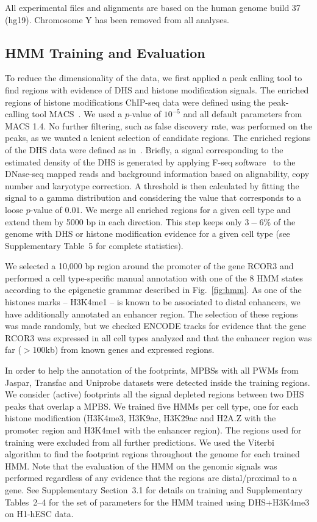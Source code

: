 \documentclass{bioinfo}
\begin{document}
\begin{methods}
All experimental files and alignments are based on the human genome build 37 (hg19).
Chromosome Y has been removed from all analyses.

\subsection{HMM Training and Evaluation}
\label{sec:application.hmm}

To reduce the dimensionality of the data, we first applied a peak calling tool
to find regions with evidence of DHS and histone modification signals. The enriched
regions of histone modifications ChIP-seq data were defined using the peak-calling
tool MACS~\citep{zhang2008}. We used a $p$-value of $ 10^{-5} $ and all default
parameters from MACS 1.4. No further filtering, such as false discovery rate, was
performed on the peaks, as we wanted a lenient selection of candidate regions. The
enriched regions of the DHS data were defined as in~\cite{boyle2011}. Briefly, a
signal corresponding to the estimated density of the DHS is generated by applying F-seq
software~\citep{boyle2008b} to the DNase-seq mapped reads and background information
based on alignability, copy number and karyotype correction. A threshold is then
calculated by fitting the signal to a gamma distribution and considering the value
that corresponds to a loose $p$-value of $ 0.01 $. We merge all enriched regions
for a given cell type and extend them by 5000 bp in each direction. This step keeps
only $3-6\%$ of the genome with DHS or histone modification evidence for a given
cell type (see Supplementary Table~5 for complete statistics).

We selected a 10,000 bp region around the promoter of the gene RCOR3 and performed
a cell type-specific manual annotation with one of the 8 HMM states according to the
epigenetic grammar described in Fig.~\ref{fig:hmm}. As one of the histones marks
-- H3K4me1 -- is known to be associated to distal enhancers, we have additionally
annotated an enhancer region. The selection of these regions was made randomly, but
we checked ENCODE tracks for evidence that the gene RCOR3 was expressed in all cell types
analyzed and that the enhancer region was far ($>$100kb) from known genes and expressed
regions.

In order to help the annotation of the footprints, MPBSs with all PWMs from Jaspar,
Transfac and Uniprobe datasets were detected inside the training regions. We consider
(active) footprints all the signal depleted regions between two DHS peaks that overlap
a MPBS. We trained five HMMs per cell type, one for each histone modification (H3K4me3, H3K9ac,
H3K29ac and H2A.Z with the promoter region and H3K4me1 with the enhancer region). The regions
used for training were excluded from all further predictions. We used the Viterbi algorithm
to find the footprint regions throughout the genome for each trained HMM. Note that the
evaluation of the HMM on the genomic signals was performed regardless of any evidence that
the regions are distal/proximal to a gene. See Supplementary Section~3.1 for details
on training and Supplementary Tables~2--4 for the set of parameters for the HMM trained
using DHS+H3K4me3 on H1-hESC data.


\end{methods}
\end{document}
